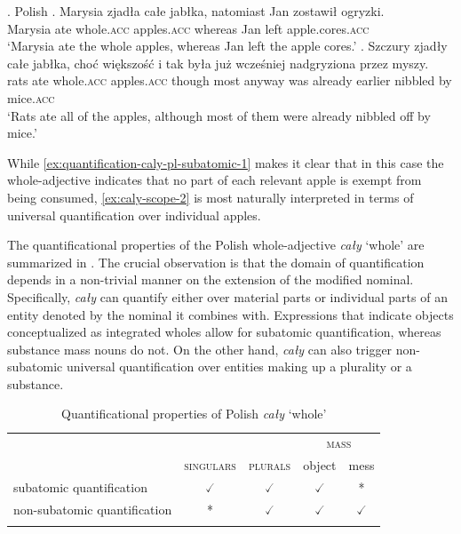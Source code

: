 \ex. Polish\label{ex:quantification-caly-pl-subatomic}
\ag. Marysia zjadła całe jabłka, natomiast Jan zostawił ogryzki.\\
Marysia ate whole\textsc{.acc} apples\textsc{.acc} whereas Jan left apple.cores\textsc{.acc}\\
`Marysia ate the whole apples, whereas Jan left the apple cores.'\label{ex:quantification-caly-pl-subatomic-1}
\bg. Szczury zjadły całe jabłka, choć większość {i tak} była już wcześniej nadgryziona przez myszy.\\
rats ate whole\textsc{.acc} apples\textsc{.acc} though most anyway was already earlier nibbled by mice\textsc{.acc}\\
`Rats ate all of the apples, although most of them were already nibbled off by mice.'\label{ex:caly-scope-2}

While \ref{ex:quantification-caly-pl-subatomic-1} makes it clear that in this case the whole-adjective indicates that no part of each relevant apple is exempt from being consumed, \ref{ex:caly-scope-2} is most naturally interpreted in terms of universal quantification over individual apples.

The quantificational properties of the Polish whole-adjective \textit{cały} `whole' are summarized in  . The crucial observation is that the domain of quantification depends in a non-trivial manner on the extension of the modified nominal. Specifically, \textit{cały} can quantify either over material parts or individual parts of an entity denoted by the nominal it combines with. Expressions that indicate objects conceptualized as integrated wholes allow for subatomic quantification, whereas substance mass nouns do not. On the other hand, \textit{cały} can also trigger non-subatomic universal quantification over entities making up a plurality or a substance. 

		\begin{table}[h]
			\centering
			\begin{tabular}{lcccc}
				\lsptoprule
				& & & \multicolumn{2}{c}{\textsc{mass}}\\
				& \textsc{singulars} & \textsc{plurals} & object & mess \\ \midrule
				subatomic quantification  & $\checked$    & $\checked$           & $\checked$      & *  \\
				non-subatomic quantification & *              & $\checked$ & $\checked$      & $\checked$            \\ \lspbottomrule
			\end{tabular}
			\caption{Quantificational properties of Polish \textit{cały} `whole'}
            \label{tab:quantificational-properties-of-polish-caly}
		\end{table}

